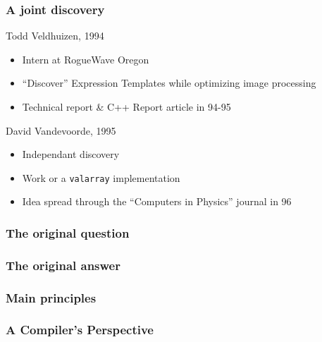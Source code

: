 
\begin{frame}
\frametitle{A joint discovery}
\begin{block}{Todd Veldhuizen, 1994}
\begin{itemize}
\item Intern at RogueWave Oregon
\item ``Discover'' Expression Templates while optimizing image processing
\item Technical report \& C++ Report article in 94-95
\end{itemize}
\end{block}{}

\begin{block}{David Vandevoorde, 1995}
\begin{itemize}
\item Independant discovery 
\item Work or a \texttt{valarray} implementation
\item Idea spread through the ``Computers in Physics'' journal in 96
\end{itemize}
\end{block}{}
\end{frame}

\begin{frame}
\frametitle{The original question}
\begin{center}\end{center}
\end{frame}

\begin{frame}
\frametitle{The original answer}
\begin{center}\end{center}
\end{frame}

\begin{frame}
\frametitle{Main principles}
\begin{center}\end{center}
\end{frame}


\begin{frame}
\frametitle{A Compiler's Perspective}
\end{frame}

